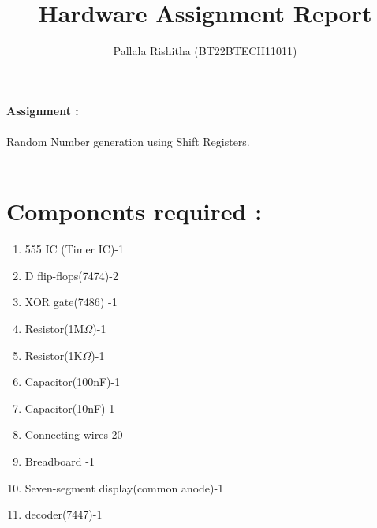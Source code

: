 \documentclass[12pt,onecolumn,notitlepage]{article}
\title{Hardware Assignment Report}
\author{Pallala Rishitha (BT22BTECH11011)}
\date{}
\begin{document}
\maketitle
\textbf{\LARGE{Assignment :}}\\\\
Random Number generation using Shift Registers.\\\\


   \section*{Components required :}
\begin{enumerate}

  \setlength\itemsep{0pt} %
  \item     555 IC (Timer IC)-1
\item D flip-flops(7474)-2
\item XOR gate(7486) -1
\item Resistor(1M$\Omega$)-1
\item Resistor(1K$\Omega$)-1
\item Capacitor(100nF)-1
\item Capacitor(10nF)-1
\item Connecting wires-20
\item Breadboard -1
\item Seven-segment display(common anode)-1
\item decoder(7447)-1

\end{enumerate} 
\end{document}
